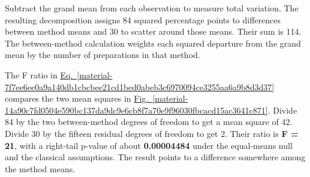 \documentclass[11pt,a4paper]{article}
\begin{document}
Subtract the grand mean from each observation to measure total variation. The resulting decomposition assigns 84 squared percentage points to differences between method means and 30 to scatter around those means. Their sum is 114. The between-method calculation weights each squared departure from the grand mean by the number of preparations in that method.


The F ratio in \hyperref[material-7f7ee6ee0a9a140db1cbcbee21cd1bed0abeb3c6970094ce3255aa6a9b8d3d37]{Eq.~\ref*{material-7f7ee6ee0a9a140db1cbcbee21cd1bed0abeb3c6970094ce3255aa6a9b8d3d37}} compares the two mean squares in \hyperref[material-14a90c7fd0504e590bc137da9dc9e6cb8f7a70e9f96030fbcacd15ac3641c871]{Fig.~\ref*{material-14a90c7fd0504e590bc137da9dc9e6cb8f7a70e9f96030fbcacd15ac3641c871}}. Divide 84 by the two between-method degrees of freedom to get a mean square of 42. Divide 30 by the fifteen residual degrees of freedom to get 2. Their ratio is \textbf{F = 21}, with a right-tail p-value of about \textbf{0.00004484} under the equal-means null and the classical assumptions. The result points to a difference somewhere among the method means.
\end{document}
